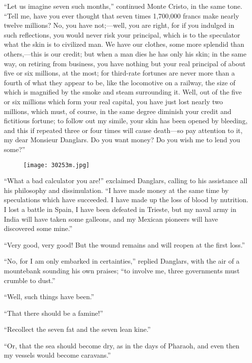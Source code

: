 “Let us imagine seven such months,” continued Monte Cristo, in the same
tone. “Tell me, have you ever thought that seven times 1,700,000 francs
make nearly twelve millions? No, you have not;—well, you are right, for
if you indulged in such reflections, you would never risk your
principal, which is to the speculator what the skin is to civilized
man. We have our clothes, some more splendid than others,—this is our
credit; but when a man dies he has only his skin; in the same way, on
retiring from business, you have nothing but your real principal of
about five or six millions, at the most; for third-rate fortunes are
never more than a fourth of what they appear to be, like the locomotive
on a railway, the size of which is magnified by the smoke and steam
surrounding it. Well, out of the five or six millions which form your
real capital, you have just lost nearly two millions, which must, of
course, in the same degree diminish your credit and fictitious fortune;
to follow out my simile, your skin has been opened by bleeding, and
this if repeated three or four times will cause death—so pay attention
to it, my dear Monsieur Danglars. Do you want money? Do you wish me to
lend you some?”

\begin{figure}[ht]
\texttt{[image: 30253m.jpg]}
\end{figure}

“What a bad calculator you are!” exclaimed Danglars, calling to his
assistance all his philosophy and dissimulation. “I have made money at
the same time by speculations which have succeeded. I have made up the
loss of blood by nutrition. I lost a battle in Spain, I have been
defeated in Trieste, but my naval army in India will have taken some
galleons, and my Mexican pioneers will have discovered some mine.”

“Very good, very good! But the wound remains and will reopen at the
first loss.”

“No, for I am only embarked in certainties,” replied Danglars, with the
air of a mountebank sounding his own praises; “to involve me, three
governments must crumble to dust.”

“Well, such things have been.”

“That there should be a famine!”

“Recollect the seven fat and the seven lean kine.”

“Or, that the sea should become dry, as in the days of Pharaoh, and
even then my vessels would become caravans.”

